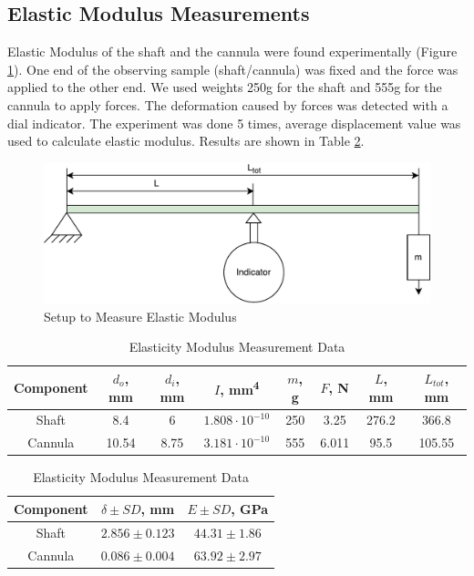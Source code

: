 	\subsection{Elastic Modulus Measurements}
	\label{sec:ElasMod}
	Elastic Modulus of the shaft and the cannula were found experimentally (Figure \ref{fig:ElasModSet}). One end of the observing sample (shaft/cannula) was fixed and the force was applied to the other end. We used weights 250g for the shaft and 555g for the cannula to apply forces. The deformation caused by forces was detected with a dial indicator. The experiment was done 5 times, average displacement value was used to calculate elastic modulus. Results are shown in Table \ref{tab:elasMod}.
	
\begin{figure}[h]
	\begin{center}
		\includegraphics[width=120mm]{fig/methods/el_mod_set.pdf}
	\end{center}
	\vspace{-4mm}
	\caption[Setup to Measure Elastic Modulus]
	{Setup to Measure Elastic Modulus}
	\label{fig:ElasModSet}
	\vspace{-2mm}
\end{figure}

\begin{table}[h]
\caption {Elasticity Modulus Measurement Data} \label{tab:elasMod} 
\begin{tabular}{ | c | c | c | c | c | c | c | c | } 
\hline
Component & $d_o$, mm & $d_i$, mm & $I$, mm\textsuperscript{4} & $m$, g & $F$, N & $L$, mm & $L_{tot}$, mm \\ 
\hline
Shaft & 8.4 & 6 & $1.808 \cdot 10^{-10}$ & 250 & 3.25 & 276.2 & 366.8\\ 
\hline
Cannula & 10.54 & 8.75 & $3.181 \cdot 10^{-10}$ & 555 & 6.011 & 95.5 & 105.55 \\ 
\hline
\end{tabular}

\begin{tabular}{ | c | c | c | } 
\hline
Component & $\delta \pm SD$, mm & $E \pm SD$, GPa \\ 
\hline
Shaft & $2.856 \pm 0.123$ & $44.31 \pm 1.86$ \\ 
\hline
Cannula & $0.086 \pm 0.004$ & $63.92 \pm 2.97$ \\ 
\hline
\end{tabular}
\end{table}

